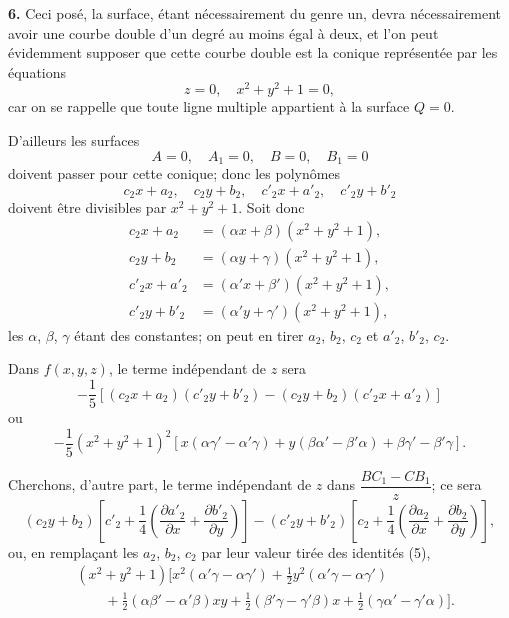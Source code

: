 \documentclass{article}
\begin{document}
\textbf{6.} Ceci posé, la surface, étant nécessairement du genre un, devra nécessairement avoir une courbe double d'un degré au moins égal à deux, et l'on peut évidemment supposer que cette courbe double est la conique représentée par les équations
\[
z = 0, \quad x^{2} + y^{2} + 1 = 0,
\]
car on se rappelle que toute ligne multiple appartient à la surface $Q = 0$.

D'ailleurs les surfaces
\[
A = 0, \quad A_{1} = 0, \quad B = 0, \quad B_{1} = 0
\]
doivent passer pour cette conique; donc les polynômes
\[
c_{2}x + a_{2}, \quad c_{2}y + b_{2}, \quad c'_{2}x + a'_{2}, \quad c'_{2}y + b'_{2}
\]
doivent être divisibles par $x^{2} + y^{2} + 1$. Soit donc
\[
\begin{aligned}
c_{2}x + a_{2} &= (\alpha x + \beta)(x^{2} + y^{2} + 1), \\
c_{2}y + b_{2} &= (\alpha y + \gamma)(x^{2} + y^{2} + 1), \\
c'_{2}x + a'_{2} &= (\alpha'x + \beta')(x^{2} + y^{2} + 1), \\
c'_{2}y + b'_{2} &= (\alpha'y + \gamma')(x^{2} + y^{2} + 1),
\end{aligned}
\tag{5}
\]
les $\alpha$, $\beta$, $\gamma$ étant des constantes; on peut en tirer $a_{2}$, $b_{2}$, $c_{2}$ et $a'_{2}$, $b'_{2}$, $c_{2}$.

Dans $f(x, y, z)$, le terme indépendant de $z$ sera
\[
-\frac{1}{5}[(c_{2}x + a_{2})(c'_{2}y + b'_{2}) - (c_{2}y + b_{2})(c'_{2}x + a'_{2})]
\]
ou
\[
-\frac{1}{5}(x^{2} + y^{2} + 1)^{2}[x(\alpha\gamma' - \alpha'\gamma) + y(\beta\alpha' - \beta'\alpha) + \beta\gamma' - \beta'\gamma].
\tag{6}
\]

Cherchons, d'autre part, le terme indépendant de $z$ dans $\dfrac{BC_{1} - CB_{1}}{z}$;
ce sera
\[
(c_{2}y + b_{2})\left[c'_{2} + \frac{1}{4}\left(\frac{\partial a'_{2}}{\partial x} + \frac{\partial b'_{2}}{\partial y}\right)\right] - (c'_{2}y + b'_{2})\left[c_{2} + \frac{1}{4}\left(\frac{\partial a_{2}}{\partial x} + \frac{\partial b_{2}}{\partial y}\right)\right],
\]
ou, en remplaçant les $a_{2}$, $b_{2}$, $c_{2}$ par leur valeur tirée des identités (5),
\[
\begin{aligned}
&(x^{2} + y^{2} + 1)[x^{2}(\alpha'\gamma - \alpha\gamma') + \frac{1}{2}y^{2}(\alpha'\gamma - \alpha\gamma') \\
&\qquad + \frac{1}{2}(\alpha\beta' - \alpha'\beta)xy + \frac{1}{2}(\beta'\gamma - \gamma'\beta)x + \frac{1}{2}(\gamma\alpha' - \gamma'\alpha)].
\end{aligned}
\tag{7}
\]
\end{document}
